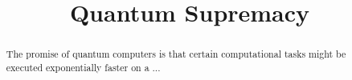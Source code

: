 \documentclass[a4paper, 10pt, conference]{IEEEtran}
\begin{document}


%
%
%
\title{Quantum Supremacy}
\author{
}
%

\maketitle                %


%
%
%
\begin{abstract}
The promise of quantum computers is that certain computational tasks might be
executed exponentially faster on a ...
\end{abstract}
%




%
%
%





%


%
%
%
%


%
\end{document}
